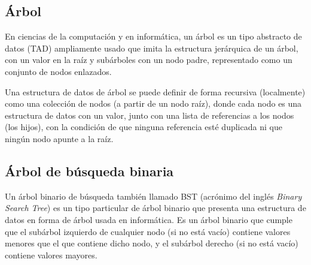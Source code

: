\subsection{Árbol}
En ciencias de la computación y en informática, un árbol es un tipo abstracto de datos (TAD) ampliamente usado que imita la estructura jerárquica de un árbol, con un valor en la raíz y subárboles con un nodo padre, representado como un conjunto de nodos enlazados.

Una estructura de datos de árbol se puede definir de forma recursiva (localmente) como una colección de nodos (a partir de un nodo raíz), donde cada nodo es una estructura de datos con un valor, junto con una lista de referencias a los nodos (los hijos), con la condición de que ninguna referencia esté duplicada ni que ningún nodo apunte a la raíz. 


\subsection{Árbol de búsqueda binaria}
Un árbol binario de búsqueda también llamado BST (acrónimo del inglés \emph{Binary Search Tree}) es un tipo particular de árbol binario que presenta una estructura de datos en forma de árbol usada en informática. Es un árbol binario que cumple que el subárbol izquierdo de cualquier nodo (si no está vacío) contiene valores menores que el que contiene dicho nodo, y el subárbol derecho (si no está vacío) contiene valores mayores. 